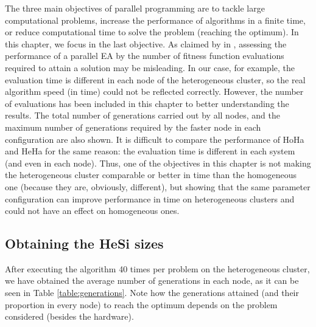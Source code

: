 The three main objectives of parallel programming are to tackle large
computational problems, increase the performance of algorithms in a
finite time, or reduce computational time to solve the problem
(reaching the optimum). In this chapter, we focus in the last
objective. %
As claimed by  in
\cite{Alba06evaluationParallel}, assessing the performance of a
parallel EA by the number of fitness function evaluations required to
attain a solution may be misleading. In our case, for example, the
evaluation time is different in each node of the heterogeneous
cluster, so the real algorithm speed (in time) could not be reflected
correctly. %
 However, the number of evaluations has been included in
this chapter to better understanding the results. %
The total number of
generations carried out by all nodes, and the maximum number of
generations required by the faster node in each configuration are also
shown. It is difficult to compare the performance of HoHa and HeHa for
the same reason: the evaluation time is different in each system (and
even in each node). Thus, one of the objectives in this chapter is not
making the heterogeneous cluster comparable or better in time than the
homogeneous one (because they are, obviously, different), but showing
that the same parameter configuration can improve performance in time
on heterogeneous clusters and could not have an effect on homogeneous
ones. 

\subsection{Obtaining the HeSi sizes}
\label{subsec:adaptive:hesisizes}
After executing the algorithm 40 times per problem on the
heterogeneous cluster, %
we have obtained the average number of generations in each node, as it
can be seen in Table \ref{table:generations}. Note how the generations
attained (and their proportion in every node) to reach the optimum
depends on the problem considered (besides the hardware). %

